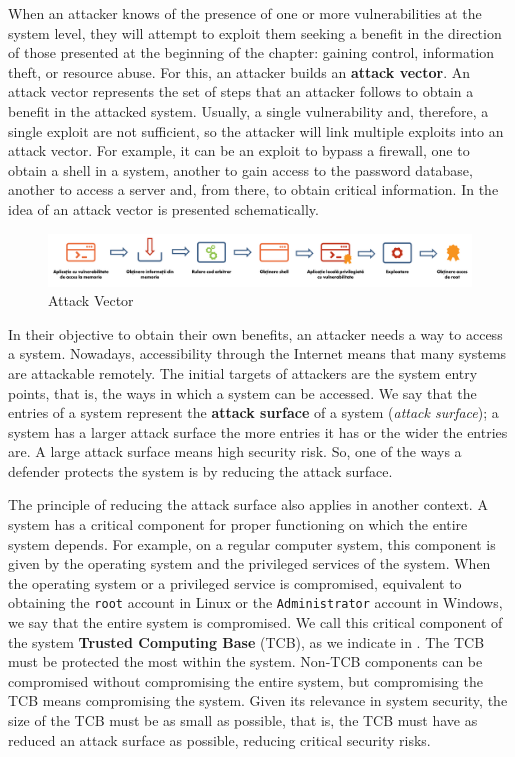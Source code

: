 When an attacker knows of the presence of one or more vulnerabilities at the system level, they will attempt to exploit them seeking a benefit in the direction of those presented at the beginning of the chapter: gaining control, information theft, or resource abuse.
For this, an attacker builds an \textbf{attack vector}.
An attack vector represents the set of steps that an attacker follows to obtain a benefit in the attacked system.
Usually, a single vulnerability and, therefore, a single exploit are not sufficient, so the attacker will link multiple exploits into an attack vector.
For example, it can be an exploit to bypass a firewall, one to obtain a shell in a system, another to gain access to the password database, another to access a server and, from there, to obtain critical information.
In  the idea of an attack vector is presented schematically.

\begin{figure}[htbp]
  \centering
  \includegraphics[width=\columnwidth]{chapters/12-auth/img/attack-vector.pdf}
  \caption{Attack Vector}
  \label{fig:sec:attack-vector}
\end{figure}

In their objective to obtain their own benefits, an attacker needs a way to access a system.
Nowadays, accessibility through the Internet means that many systems are attackable remotely.
The initial targets of attackers are the system entry points, that is, the ways in which a system can be accessed.
We say that the entries of a system represent the \textbf{attack surface} of a system (\textit{attack surface});
a system has a larger attack surface the more entries it has or the wider the entries are.
A large attack surface means high security risk.
So, one of the ways a defender protects the system is by reducing the attack surface.

The principle of reducing the attack surface also applies in another context.
A system has a critical component for proper functioning on which the entire system depends.
For example, on a regular computer system, this component is given by the operating system and the privileged services of the system.
When the operating system or a privileged service is compromised, equivalent to obtaining the \texttt{root} account in Linux or the \texttt{Administrator} account in Windows, we say that the entire system is compromised.
We call this critical component of the system \textbf{Trusted Computing Base} (TCB), as we indicate in .
The TCB must be protected the most within the system.
Non-TCB components can be compromised without compromising the entire system, but compromising the TCB means compromising the system.
Given its relevance in system security, the size of the TCB must be as small as possible, that is, the TCB must have as reduced an attack surface as possible, reducing critical security risks.

